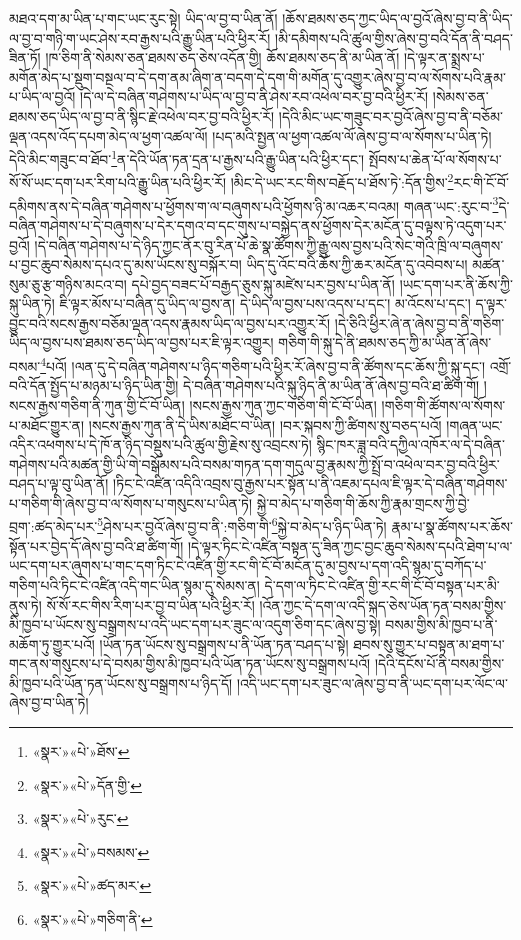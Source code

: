 མཐའ་དག་མ་ཡིན་པ་གང་ཡང་རུང་སྟེ། ཡིད་ལ་བྱ་བ་ཡིན་ནོ། །ཆོས་ཐམས་ཅད་ཀྱང་ཡིད་ལ་བྱའོ་ཞེས་བྱ་བ་ནི་ཡིད་ལ་བྱ་བ་གཉི་ག་ཡང་ཤེས་རབ་རྒྱས་པའི་རྒྱུ་ཡིན་པའི་ཕྱིར་རོ། །མི་དམིགས་པའི་ཚུལ་གྱིས་ཞེས་བྱ་བའི་དོན་ནི་བཤད་ཟིན་ཏོ། །ཁ་ཅིག་ནི་སེམས་ཅན་ཐམས་ཅད་ཅེས་འདོན་གྱི། ཆོས་ཐམས་ཅད་ནི་མ་ཡིན་ནོ། །དེ་ལྟར་ན་སྨྲས་པ་མགོན་མེད་པ་སྡུག་བསྔལ་བ་དེ་དག་ནམ་ཞིག་ན་བདག་དེ་དག་གི་མགོན་དུ་འགྱུར་ཞེས་བྱ་བ་ལ་སོགས་པའི་རྣམ་པ་ཡིད་ལ་བྱའོ། །དེ་ལ་དེ་བཞིན་གཤེགས་པ་ཡིད་ལ་བྱ་བ་ནི་ཤེས་རབ་འཕེལ་བར་བྱ་བའི་ཕྱིར་རོ། །སེམས་ཅན་ཐམས་ཅད་ཡིད་ལ་བྱ་བ་ནི་སྙིང་རྗེ་འཕེལ་བར་བྱ་བའི་ཕྱིར་རོ། །དེའི་མིང་ཡང་གཟུང་བར་བྱའོ་ཞེས་བྱ་བ་ནི་བཅོམ་ལྡན་འདས་འོད་དཔག་མེད་ལ་ཕྱག་འཚལ་ལོ། །པད་མའི་སྤྱན་ལ་ཕྱག་འཚལ་ལོ་ཞེས་བྱ་བ་ལ་སོགས་པ་ཡིན་ཏེ། དེའི་མིང་གཟུང་བ་ཐོབ་\footnote{«སྣར་»«པེ་»ཐོས་}ན་དེའི་ཡོན་ཏན་དྲན་པ་རྒྱས་པའི་རྒྱུ་ཡིན་པའི་ཕྱིར་དང་། སྤོབས་པ་ཆེན་པོ་ལ་སོགས་པ་སོ་སོ་ཡང་དག་པར་རིག་པའི་རྒྱུ་ཡིན་པའི་ཕྱིར་རོ། །མིང་དེ་ཡང་རང་གིས་བརྗོད་པ་ཐོས་ཏེ་:དོན་གྱིས་\footnote{«སྣར་»«པེ་»དོན་གྱི་}རང་གི་ངོ་བོ་དམིགས་ནས་དེ་བཞིན་གཤེགས་པ་ཕྱོགས་ག་ལ་བཞུགས་པའི་ཕྱོགས་ཉི་མ་འཆར་བའམ། གཞན་ཡང་:རུང་བ་\footnote{«སྣར་»«པེ་»རུང་}དེ་བཞིན་གཤེགས་པ་དེ་བཞུགས་པ་དེར་དགའ་བ་དང་གུས་པ་བསྐྱེད་ནས་ཕྱོགས་དེར་མངོན་དུ་བལྟས་ཏེ་འདུག་པར་བྱའོ། །དེ་བཞིན་གཤེགས་པ་དེ་ཉིད་ཀྱང་ནོར་བུ་རིན་པོ་ཆེ་སྣ་ཚོགས་ཀྱི་རྒྱུ་ལས་བྱས་པའི་སེང་གེའི་ཁྲི་ལ་བཞུགས་པ་བྱང་ཆུབ་སེམས་དཔའ་དུ་མས་ཡོངས་སུ་བསྐོར་བ། ཡིད་དུ་འོང་བའི་ཆོས་ཀྱི་ཆར་མངོན་དུ་འབེབས་པ། མཚན་སུམ་ཅུ་རྩ་གཉིས་མངའ་བ། དཔེ་བྱད་བཟང་པོ་བརྒྱད་ཅུས་སྐུ་མཛེས་པར་བྱས་པ་ཡིན་ནོ། །ཡང་དག་པར་ནི་ཆོས་ཀྱི་སྐུ་ཡིན་ཏེ། ཇི་ལྟར་མོས་པ་བཞིན་དུ་ཡིད་ལ་བྱས་ན། དེ་ཡིད་ལ་བྱས་པས་འདས་པ་དང་། མ་འོངས་པ་དང་། ད་ལྟར་བྱུང་བའི་སངས་རྒྱས་བཅོམ་ལྡན་འདས་རྣམས་ཡིད་ལ་བྱས་པར་འགྱུར་རོ། །དེ་ཅིའི་ཕྱིར་ཞེ་ན་ཞེས་བྱ་བ་ནི་གཅིག་ཡིད་ལ་བྱས་པས་ཐམས་ཅད་ཡིད་ལ་བྱས་པར་ཇི་ལྟར་འགྱུར། གཅིག་གི་སྐུ་དེ་ནི་ཐམས་ཅད་ཀྱི་མ་ཡིན་ནོ་ཞེས་བསམ་\footnote{«སྣར་»«པེ་»བསམས་}པའོ། །ལན་དུ་དེ་བཞིན་གཤེགས་པ་ཉིད་གཅིག་པའི་ཕྱིར་རོ་ཞེས་བྱ་བ་ནི་ཚོགས་དང་ཆོས་ཀྱི་སྐུ་དང་། འགྲོ་བའི་དོན་སྤྱོད་པ་མཉམ་པ་ཉིད་ཡིན་གྱི། དེ་བཞིན་གཤེགས་པའི་སྐུ་ཉིད་ནི་མ་ཡིན་ནོ་ཞེས་བྱ་བའི་ཐ་ཚིག་གོ། །སངས་རྒྱས་གཅིག་ནི་ཀུན་གྱི་ངོ་བོ་ཡིན། །སངས་རྒྱས་ཀུན་ཀྱང་གཅིག་གི་ངོ་བོ་ཡིན། །གཅིག་གི་ཚོགས་ལ་སོགས་པ་མཐོང་གྱུར་ན། །སངས་རྒྱས་ཀུན་ནི་དེ་ཡིས་མཐོང་བ་ཡིན། །བར་སྐབས་ཀྱི་ཚིགས་སུ་བཅད་པའོ། །གཞན་ཡང་འདིར་འཕགས་པ་དེ་ཁོ་ན་ཉིད་བསྡུས་པའི་ཚུལ་གྱི་རྗེས་སུ་འབྲངས་ཏེ། སྙིང་ཁར་ཟླ་བའི་དཀྱིལ་འཁོར་ལ་དེ་བཞིན་གཤེགས་པའི་མཚན་གྱི་ཡི་གེ་བསྒོམས་པའི་བསམ་གཏན་དག་གདུལ་བྱ་རྣམས་ཀྱི་སྤྲོ་བ་འཕེལ་བར་བྱ་བའི་ཕྱིར་བཤད་པ་ལྟ་བུ་ཡིན་ནོ། །ཏིང་ངེ་འཛིན་འདིའི་འབྲས་བུ་རྒྱས་པར་སྟོན་པ་ནི་འཇམ་དཔལ་ཇི་ལྟར་དེ་བཞིན་གཤེགས་པ་གཅིག་གི་ཞེས་བྱ་བ་ལ་སོགས་པ་གསུངས་པ་ཡིན་ཏེ། སྐྱེ་བ་མེད་པ་གཅིག་གི་ཆོས་ཀྱི་རྣམ་གྲངས་ཀྱི་བྱེ་བྲག་:ཚད་མེད་པར་\footnote{«སྣར་»«པེ་»ཚད་མར་}ཤེས་པར་བྱའོ་ཞེས་བྱ་བ་ནི་:གཅིག་གི་\footnote{«སྣར་»«པེ་»གཅིག་ནི་}སྐྱེ་བ་མེད་པ་ཉིད་ཡིན་ཏེ། རྣམ་པ་སྣ་ཚོགས་པར་ཆོས་སྟོན་པར་བྱེད་དོ་ཞེས་བྱ་བའི་ཐ་ཚིག་གོ། །དེ་ལྟར་ཏིང་ངེ་འཛིན་བསྟན་དུ་ཟིན་ཀྱང་བྱང་ཆུབ་སེམས་དཔའི་ཐེག་པ་ལ་ཡང་དག་པར་ཞུགས་པ་གང་དག་ཏིང་ངེ་འཛིན་གྱི་རང་གི་ངོ་བོ་མངོན་དུ་མ་བྱས་པ་དག་འདི་སྙམ་དུ་བཀོད་པ་གཅིག་པའི་ཏིང་ངེ་འཛིན་འདི་གང་ཡིན་སྙམ་དུ་སེམས་ན། དེ་དག་ལ་ཏིང་ངེ་འཛིན་གྱི་རང་གི་ངོ་བོ་བསྟན་པར་མི་ནུས་ཏེ། སོ་སོ་རང་གིས་རིག་པར་བྱ་བ་ཡིན་པའི་ཕྱིར་རོ། །འོན་ཀྱང་དེ་དག་ལ་འདི་སྐད་ཅེས་ཡོན་ཏན་བསམ་གྱིས་མི་ཁྱབ་པ་ཡོངས་སུ་བསྒྲགས་པ་འདི་ཡང་དག་པར་ཟུང་ལ་འདུག་ཅིག་དང་ཞེས་བྱ་སྟེ། བསམ་གྱིས་མི་ཁྱབ་པ་ནི་མཆོག་ཏུ་གྱུར་པའོ། །ཡོན་ཏན་ཡོངས་སུ་བསྒྲགས་པ་ནི་ཡོན་ཏན་བཤད་པ་སྟེ། ཐབས་སུ་གྱུར་པ་བསྟན་མ་ཐག་པ་གང་ནས་གསུངས་པ་དེ་བསམ་གྱིས་མི་ཁྱབ་པའི་ཡོན་ཏན་ཡོངས་སུ་བསྒྲགས་པའོ། །དེའི་དངོས་པོ་ནི་བསམ་གྱིས་མི་ཁྱབ་པའི་ཡོན་ཏན་ཡོངས་སུ་བསྒྲགས་པ་ཉིད་དོ། །འདི་ཡང་དག་པར་ཟུང་ལ་ཞེས་བྱ་བ་ནི་ཡང་དག་པར་ལོང་ལ་ཞེས་བྱ་བ་ཡིན་ཏེ། 